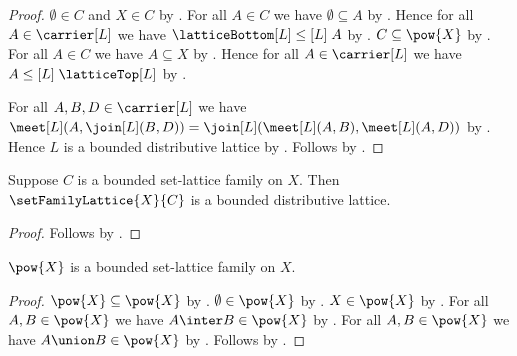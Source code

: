 \begin{proof}
    $\emptyset\in C$ and $X\in C$ by
        .
    For all $A\in C$ we have $\emptyset\subseteq A$ by
        .
    Hence for all $A\in\carrier[L]$ we have
        $\latticeBottom[L]\mathrel{\leq[L]}A$ by
        .
    $C\subseteq\pow{X}$ by
        .
    For all $A\in C$ we have $A\subseteq X$ by
        .
    Hence for all $A\in\carrier[L]$ we have
        $A\mathrel{\leq[L]}\latticeTop[L]$ by
        .

    For all $A,B,D\in\carrier[L]$ we have
        $\meet[L](A,\join[L](B,D))
            =\join[L](\meet[L](A,B),\meet[L](A,D))$ by
        .
    Hence $L$ is a bounded distributive lattice by
        .
    Follows by
        .
\end{proof}

\begin{classification}\label{set_family_lattice_is_bounded_distributive_lattice}
    Suppose $C$ is a bounded set-lattice family on $X$.
    Then $\setFamilyLattice{X}{C}$ is a bounded distributive lattice.
\end{classification}
\begin{proof}
    Follows by
        .
\end{proof}

\begin{proposition}\label{powerset_is_bounded_set_lattice_family}
    $\pow{X}$ is a bounded set-lattice family on $X$.
\end{proposition}
\begin{proof}
    $\pow{X}\subseteq\pow{X}$ by .
    $\emptyset\in\pow{X}$ by .
    $X\in\pow{X}$ by .
    For all $A,B\in\pow{X}$ we have $A\inter B\in\pow{X}$ by
        .
    For all $A,B\in\pow{X}$ we have $A\union B\in\pow{X}$ by
        .
    Follows by .
\end{proof}

